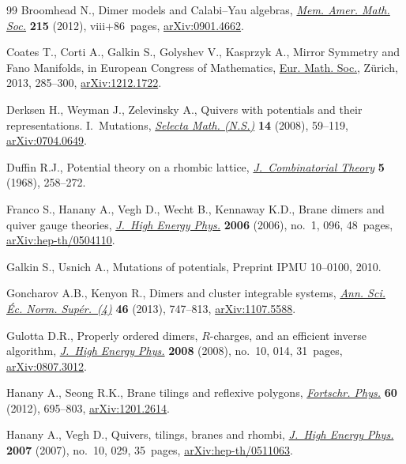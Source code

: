 \documentclass[pdftex]{sigma}%
\numberwithin{equation}{section}
\numberwithin{figure}{section}
\numberwithin{table}{section}
\begin{document}
\begin{thebibliography}{99}
Broomhead N., Dimer models and {C}alabi--{Y}au algebras, \href{https://doi.org/10.1090/S0065-9266-2011-00617-9}{\textit{Mem. Amer.
 Math. Soc.}} \textbf{215} (2012), viii+86~pages, \href{https://arxiv.org/abs/0901.4662}{arXiv:0901.4662}.

Coates T., Corti A., Galkin S., Golyshev V., Kasprzyk A., Mirror Symmetry and
 {F}ano Manifolds, in European {C}ongress of {M}athematics, \href{https://doi.org/10.4171/120-1/16}{Eur. Math. Soc.},
 Z\"urich, 2013, 285--300, \href{https://arxiv.org/abs/1212.1722}{arXiv:1212.1722}.

Derksen H., Weyman J., Zelevinsky A., Quivers with potentials and their
 representations. {I}.~{M}utations, \href{https://doi.org/10.1007/s00029-008-0057-9}{\textit{Selecta Math. (N.S.)}} \textbf{14}
 (2008), 59--119, \href{https://arxiv.org/abs/0704.0649}{arXiv:0704.0649}.

Duffin R.J., Potential theory on a rhombic lattice, \href{https://doi.org/10.1016/S0021-9800(68)80072-9}{\textit{J.~Combinatorial
 Theory}} \textbf{5} (1968), 258--272.

Franco S., Hanany A., Vegh D., Wecht B., Kennaway K.D., Brane dimers and quiver
 gauge theories, \href{https://doi.org/10.1088/1126-6708/2006/01/096}{\textit{J.~High Energy Phys.}} \textbf{2006} (2006), no.~1,
 096, 48~pages, \href{https://arxiv.org/abs/hep-th/0504110}{arXiv:hep-th/0504110}.

Galkin S., Usnich A., Mutations of potentials, {P}reprint IPMU 10--0100, 2010.

Goncharov A.B., Kenyon R., Dimers and cluster integrable systems, \href{https://doi.org/10.24033/asens.2201}{\textit{Ann.
 Sci. \'Ec. Norm. Sup\'er.~(4)}} \textbf{46} (2013), 747--813,
 \href{https://arxiv.org/abs/1107.5588}{arXiv:1107.5588}.

Gulotta D.R., Properly ordered dimers, {$R$}-charges, and an efficient inverse
 algorithm, \href{https://doi.org/10.1088/1126-6708/2008/10/014}{\textit{J.~High Energy Phys.}} \textbf{2008} (2008), no.~10, 014,
 31~pages, \href{https://arxiv.org/abs/0807.3012}{arXiv:0807.3012}.

Hanany A., Seong R.K., Brane tilings and reflexive polygons, \href{https://doi.org/10.1002/prop.201200008}{\textit{Fortschr.
 Phys.}} \textbf{60} (2012), 695--803, \href{https://arxiv.org/abs/1201.2614}{arXiv:1201.2614}.

Hanany A., Vegh D., Quivers, tilings, branes and rhombi, \href{https://doi.org/10.1088/1126-6708/2007/10/029}{\textit{J.~High Energy
 Phys.}} \textbf{2007} (2007), no.~10, 029, 35~pages, \href{https://arxiv.org/abs/hep-th/0511063}{arXiv:hep-th/0511063}.


\end{thebibliography}
\end{document}
